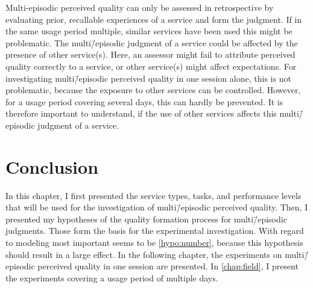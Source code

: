 Multi-episodic perceived quality can only be assessed in retrospective by evaluating prior, recallable experiences of a service and form the judgment.
If in the same usage period multiple, similar services have been used this might be problematic.
The multi\=/episodic judgment of a service could be affected by the presence of other service(s).
Here, an assessor might fail to attribute perceived quality correctly to a service, or other service(s) might affect expectations.
For investigating multi\=/episodic perceived quality in one session alone, this is not problematic, because the exposure to other services can be controlled.
However, for a usage period covering several days, this can hardly be prevented.
It is therefore important to understand, if the use of other services affects this multi\=/episodic judgment of a service.

\section{Conclusion}
In this chapter, I first presented the service types, tasks, and performance levels that will be used for the investigation of multi\=/episodic perceived quality.
Then, I presented my hypotheses of the quality formation process for multi\=/episodic judgments.
Those form the basis for the experimental investigation.
With regard to modeling most important seems to be \autoref{hypo:number}, because this hypothesis should result in a large effect.
In the following chapter, the experiments on multi\=/episodic perceived quality in one session are presented.
In \autoref{chap:field}, I present the experiments covering a usage period of multiple days. 
